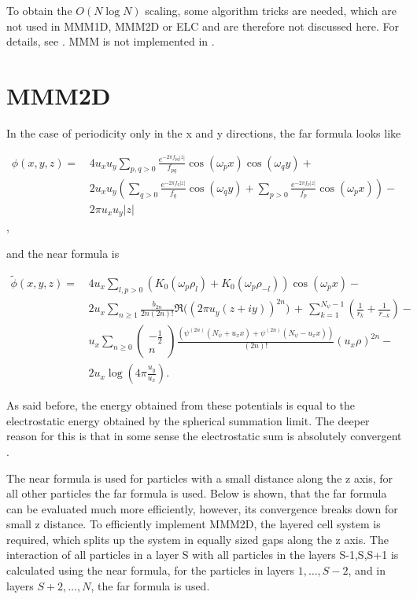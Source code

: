 To obtain the $O(N\log N)$ scaling, some algorithm tricks are needed,
which are not used in MMM1D, MMM2D or ELC and are therefore not
discussed here. For details, see \citet{strebel99a}. MMM is not
implemented in \es.

\section{MMM2D}

In the case of periodicity only in the x and y directions, the far
formula looks like

\[ \begin{array}{rl} \phi(x,y,z) = \, & 4 u_x u_y\sum_{p,q>0}
  \frac{e^{-2\pi f_{pq}|z|}} {f_{pq}} \cos(\omega_p x)\cos(\omega_q y)
  +\\ & 2 u_x u_y\left(\sum_{q>0} \frac{e^{-2\pi f_q|z|}}{f_q}
    \cos(\omega_q y) + \sum_{p>0} \frac{e^{-2\pi f_p|z|}}{f_p}
    \cos(\omega_p x)\right) -\\ & 2\pi u_x u_y |z| \end{array} \],

and the near formula is

\[ \begin{array}{rl} \tilde\phi(x,y,z)=\, &
  4u_x\sum_{l,p>0}\left(K_0(\omega_p\rho_l) +
    K_0(\omega_p\rho_{-l})\right)\cos(\omega_p x) -\\ & 2u_x\sum_{n\ge
    1}\frac{b_{2n}}{2n(2n)!} \Re\bigl((2\pi u_y
  (z+iy))^{2n}\bigr)\,+\, \sum_{k=1}^{N_\psi-1}\left(\frac{1}{r_{k}} +
    \frac{1}{r_{-k}}\right) -\\ & u_x\sum_{n\ge
    0}\left(\begin{array}{c}-\frac{1}{2}\\n\end{array}\right)\frac{\left(
      \psi^{(2n)}(N_\psi + u_x x) + \psi^{(2n)}(N_\psi - u_x
      x)\right)}{(2n)!}(u_x\rho)^{2n} -\\ &
  2u_x\log\left(4\pi\frac{u_y}{u_x}\right). \end{array} \]

As said before, the energy obtained from these potentials is equal to
the electrostatic energy obtained by the spherical summation limit.
The deeper reason for this is that in some sense the electrostatic sum
is absolutely convergent \citep{mmm2d}.

The near formula is used for particles with a small distance along the
z axis, for all other particles the far formula is used. Below is
shown, that the far formula can be evaluated much more efficiently,
however, its convergence breaks down for small z distance. To
efficiently implement MMM2D, the layered cell system is required,
which splits up the system in equally sized gaps along the z axis. The
interaction of all particles in a layer S with all particles in the
layers S-1,S,S+1 is calculated using the near formula, for the
particles in layers $1,\dots,S-2$, and in layers $S+2,\dots,N$, the
far formula is used.

